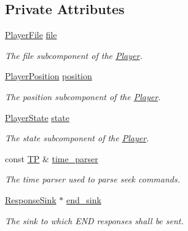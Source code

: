 \subsection*{Private Attributes}
\begin{DoxyCompactItemize}
\item 
\hypertarget{classPlayer_abcb788a7830c40ae5ba2a219c5341a58}{\hyperlink{classPlayerFile}{Player\+File} \hyperlink{classPlayer_abcb788a7830c40ae5ba2a219c5341a58}{file}}\label{classPlayer_abcb788a7830c40ae5ba2a219c5341a58}

\begin{DoxyCompactList}\small\item\em The file subcomponent of the \hyperlink{classPlayer}{Player}. \end{DoxyCompactList}\item 
\hypertarget{classPlayer_a7b0a4ce9f2ebf3d1e026cf3e0ee61152}{\hyperlink{classPlayerPosition}{Player\+Position} \hyperlink{classPlayer_a7b0a4ce9f2ebf3d1e026cf3e0ee61152}{position}}\label{classPlayer_a7b0a4ce9f2ebf3d1e026cf3e0ee61152}

\begin{DoxyCompactList}\small\item\em The position subcomponent of the \hyperlink{classPlayer}{Player}. \end{DoxyCompactList}\item 
\hypertarget{classPlayer_afb60fdad921bce05783ef2709e849c27}{\hyperlink{classPlayerState}{Player\+State} \hyperlink{classPlayer_afb60fdad921bce05783ef2709e849c27}{state}}\label{classPlayer_afb60fdad921bce05783ef2709e849c27}

\begin{DoxyCompactList}\small\item\em The state subcomponent of the \hyperlink{classPlayer}{Player}. \end{DoxyCompactList}\item 
\hypertarget{classPlayer_ad7c6ccd4156c01d419825abe6704fca7}{const \hyperlink{classPlayer_ab2c65f4a7cbaf6aab6fafbb5633a42c4}{T\+P} \& \hyperlink{classPlayer_ad7c6ccd4156c01d419825abe6704fca7}{time\+\_\+parser}}\label{classPlayer_ad7c6ccd4156c01d419825abe6704fca7}

\begin{DoxyCompactList}\small\item\em The time parser used to parse seek commands. \end{DoxyCompactList}\item 
\hypertarget{classPlayer_aa6e6da38e67a266350452cfbc6d8341b}{\hyperlink{classResponseSink}{Response\+Sink} $\ast$ \hyperlink{classPlayer_aa6e6da38e67a266350452cfbc6d8341b}{end\+\_\+sink}}\label{classPlayer_aa6e6da38e67a266350452cfbc6d8341b}

\begin{DoxyCompactList}\small\item\em The sink to which E\+N\+D responses shall be sent. \end{DoxyCompactList}\end{DoxyCompactItemize}


